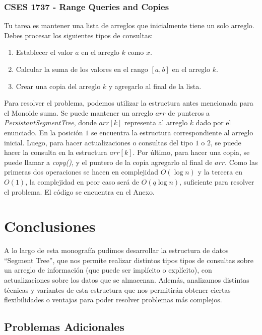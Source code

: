 \documentclass{article}
\begin{document}
\subsubsection{CSES 1737 - Range Queries and Copies}

\begin{tcolorbox}
Tu tarea es mantener una lista de arreglos que inicialmente tiene un solo arreglo. Debes procesar los siguientes tipos de consultas:

\begin{enumerate}
    \item Establecer el valor $a$ en el arreglo $k$ como $x$.
    \item Calcular la suma de los valores en el rango $[a, b]$ en el arreglo $k$.
    \item Crear una copia del arreglo $k$ y agregarlo al final de la lista.
\end{enumerate}
\end{tcolorbox}

Para resolver el problema, podemos utilizar la estructura antes mencionada para el Monoide suma. Se puede mantener un arreglo $arr$ de punteros a \textit{PersistantSegmentTree}, donde $arr[k]$ representa al arreglo $k$ dado por el enunciado. En la posición $1$ se encuentra la estructura correspondiente al arreglo inicial. Luego, para hacer actualizaciones o consultas del tipo $1$ o $2$, se puede hacer la consulta en la estructura $arr[k]$. Por último, para hacer una copia, se puede llamar a \textit{copy()}, y el puntero de la copia agregarlo al final de $arr$. Como las primeras dos operaciones se hacen en complejidad $O(\log n)$ y la tercera en $O(1)$, la complejidad en peor caso será de $O(q \log n)$, suficiente para resolver el problema. El código se encuentra en el Anexo.

\section{Conclusiones}

A lo largo de esta monografía pudimos desarrollar la estructura de datos ``Segment Tree'', que nos permite realizar distintos tipos tipos de consultas sobre un arreglo de información (que puede ser implícito o explícito), con actualizaciones sobre los datos que se almacenan. Además, analizamos distintas técnicas y variantes de esta estructura que nos permitirán obtener ciertas flexibilidades o ventajas para poder resolver problemas más complejos.

\subsection{Problemas Adicionales}
\end{document}
